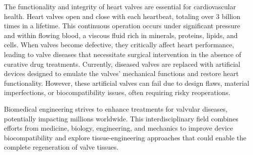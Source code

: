 
The functionality and integrity of heart valves are essential for cardiovascular health. Heart valves open and close with each heartbeat, totaling over 3 billion times in a lifetime. This continuous operation occurs under significant pressure and within flowing blood, a viscous fluid rich in minerals, proteins, lipids, and cells. When valves become defective, they critically affect heart performance, leading to valve diseases that necessitate surgical intervention in the absence of curative drug treatments. Currently, diseased valves are replaced with artificial devices designed to emulate the valves' mechanical functions and restore heart functionality. However, these artificial valves can fail due to design flaws, material imperfections, or biocompatibility issues, often requiring risky reoperations. ~

Biomedical engineering strives to enhance treatments for valvular diseases, potentially impacting millions worldwide. This interdisciplinary field combines efforts from medicine, biology, engineering, and mechanics to improve device biocompatibility and explore tissue-engineering approaches that could enable the complete regeneration of valve tissues. ~

